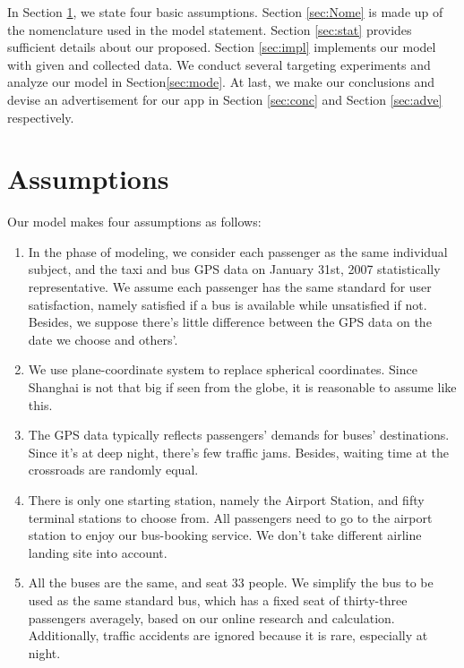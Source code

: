 \documentclass{mcmthesis}
\begin{document}
In Section \ref{sec:assu}, we state four basic assumptions. Section \ref{sec:Nome} is made up of the nomenclature used in the model statement. Section \ref{sec:stat} provides sufficient details about our proposed. Section \ref{sec:impl} implements our model with given and collected data. We conduct several targeting experiments and analyze our model in Section\ref{sec:mode}. At last, we make our conclusions and devise an advertisement for our app in Section \ref{sec:conc} and Section \ref{sec:adve} respectively.

\section{Assumptions}\label{sec:assu}

Our model makes four assumptions as follows:

\begin{enumerate}
	\item In the phase of modeling, we consider each passenger as the same individual subject, and the taxi and bus GPS data on January 31st, 2007 statistically representative. We assume each passenger has the same standard for user satisfaction, namely satisfied if a bus is available while unsatisfied if not. Besides, we suppose there's little difference between the GPS data on the date we choose and others'.
	\item We use plane-coordinate system to replace spherical coordinates. Since Shanghai is not that big if seen from the globe, it is reasonable to assume like this.
	\item The GPS data typically reflects passengers' demands for buses' destinations. Since it's at deep night, there's few traffic jams. Besides, waiting time at the crossroads are randomly equal. 
	\item There is only one starting station, namely the Airport Station, and fifty terminal stations to choose from. All passengers need to go to the airport station to enjoy our bus-booking service. We don't take different airline landing site into account. 
	\item All the buses are the same, and seat 33 people. We simplify the bus to be used as the same standard bus, which has a fixed seat of thirty-three passengers averagely, based on our online research and calculation. Additionally, traffic accidents are ignored because it is rare, especially at night.
\end{enumerate}
\end{document}
